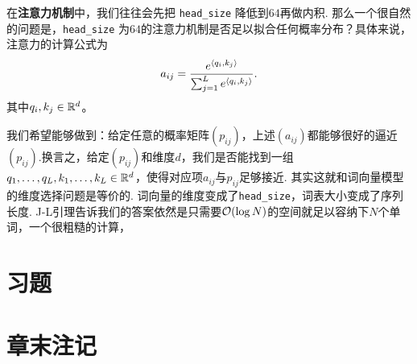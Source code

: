 \begin{example}[多头注意力]
在\textbf{注意力机制}中，我们往往会先把 \verb#head_size# 降低到$64$再做内积. 那么一个很自然的问题是，\verb#head_size# 为$64$的注意力机制是否足以拟合任何概率分布？具体来说，注意力的计算公式为
    \[
    a_{ij} = \frac{e^{\left\langle{q_i},{k_j}\right\rangle}}{\sum_{j=1}^L e^{\left\langle{q_i},{k_j}\right\rangle}}.
    \]
其中$q_i,k_j \in \mathbb{R}^d$。

我们希望能够做到：给定任意的概率矩阵$(p_{ij})$，上述$(a_{ij})$都能够很好的逼近$(p_{ij})$.换言之，给定$(p_{ij})$和维度$d$，我们是否能找到一组$q_1,\dots,q_L,k_1,\dots,k_L\in \mathbb{R}^d$，使得对应项$a_{ij}$与$p_{ij}$足够接近. 其实这就和词向量模型的维度选择问题是等价的. 词向量的维度变成了\verb#head_size#，词表大小变成了序列长度. J-L引理告诉我们的答案依然是只需要$\mathcal{O}(\log N)$的空间就足以容纳下$N$个单词，一个很粗糙的计算，
\end{example}
\section{习题}

\section{章末注记}